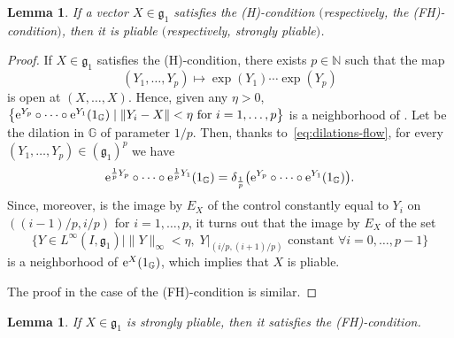 \documentclass[pdftex]{sigma}
\numberwithin{equation}{section}
\newtheorem{Lemma}[Theorem]{Lemma}
\theoremstyle{definition}
\begin{document}
\begin{Lemma}\label{lem:iii)-->i)}
 If a vector $X\in{\mathfrak g}_1$ satisfies the {\rm (H)}-condition $($respectively, the {\rm (FH)}-condition$)$, then it is pliable $($respectively, strongly pliable$)$.
\end{Lemma}

\begin{proof}
If $X\in {\mathfrak g}_1$ satisfies the (H)-condition, there exists $p\in\mathbb{N}$ such that the map
 \begin{equation*}
 (Y_1,\dots,Y_p)\mapsto \exp(Y_{1}) \cdots \exp(Y_{p})
 \end{equation*}
 is open at $(X,\dots,X)$.
Hence, given any $\eta>0$,
$\bigl\{ {\rm e}^{Y_{p}}\circ \dots \circ {\rm e}^{Y_{1}}(1_{\mathbb{G}}) \mid \|Y_i-X\|<\eta\mbox{ for }i=1,\dots,p\bigr\}$
is a neighborhood of . Let  be the dilation in $\mathbb{G}$ of parameter $1/p$. Then, thanks to~\eqref{eq:dilations-flow}, for every $(Y_1,\dots,Y_p)\in ({\mathfrak g}_1)^p$ we have
\[{\rm e}^{{\frac 1p}Y_{p}}\circ \dots \circ {\rm e}^{{\frac 1p}Y_{1}}(1_\mathbb{G}) = \delta_{\frac 1p}\bigl({\rm e}^{Y_{p}}\circ \dots \circ {\rm e}^{Y_{1}}(1_\mathbb{G})\bigr).\]
Since, moreover,  is the image by $E_X$ of the control constantly equal to $Y_i$ on $((i-1)/p,i/p)$ for $i=1,\dots,p$, it turns out that
the
image by $E_X$
of the set
\[\bigl\{Y\in L^{\infty}(I,{\mathfrak g}_1)\mid \|Y\|_\infty<\eta,\;Y|_{(i/p,(i+1)/p)}\mbox{ constant }\forall i=0,\dots,p-1\bigr\}\]
is
a neighborhood of ${\rm e}^{X}(1_\mathbb{G})$, which implies that $X$ is pliable.

The proof in the case of the (FH)-condition is similar.
\end{proof}

\begin{Lemma}\label{lem:strongly pliable implies weak-strong H}
If $X\in {\mathfrak g}_1$ is strongly pliable, then it satisfies the {\rm (FH)}-condition.
\end{Lemma}
\end{document}
